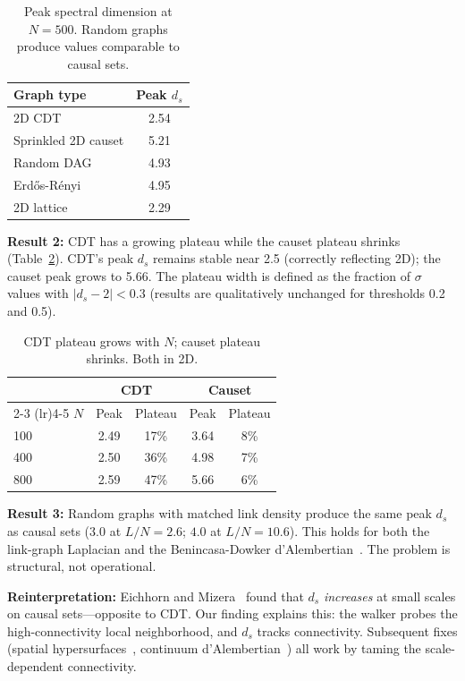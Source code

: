 \documentclass[aps,prd,twocolumn,superscriptaddress,nofootinbib]{revtex4-2}
\begin{document}
\begin{table}[h]
\centering
\begin{tabular}{lc}
\toprule
Graph type & Peak $d_s$ \\
\midrule
2D CDT & 2.54 \\
Sprinkled 2D causet & 5.21 \\
Random DAG & 4.93 \\
Erd\H{o}s-R\'enyi & 4.95 \\
2D lattice & 2.29 \\
\bottomrule
\end{tabular}
\caption{Peak spectral dimension at $N = 500$. Random graphs produce values comparable to causal sets.}
\label{tab:crossing}
\end{table}

\textbf{Result 2:} CDT has a growing plateau while the causet plateau shrinks (Table~\ref{tab:plateau}). CDT's peak $d_s$ remains stable near 2.5 (correctly reflecting 2D); the causet peak grows to 5.66. The plateau width is defined as the fraction of $\sigma$ values with $|d_s - 2| < 0.3$ (results are qualitatively unchanged for thresholds 0.2 and 0.5).

\begin{table}[h]
\centering
\begin{tabular}{lcccc}
\toprule
& \multicolumn{2}{c}{CDT} & \multicolumn{2}{c}{Causet} \\
\cmidrule(lr){2-3} \cmidrule(lr){4-5}
$N$ & Peak & Plateau & Peak & Plateau \\
\midrule
100 & 2.49 & 17\% & 3.64 & 8\% \\
400 & 2.50 & 36\% & 4.98 & 7\% \\
800 & 2.59 & 47\% & 5.66 & 6\% \\
\bottomrule
\end{tabular}
\caption{CDT plateau grows with $N$; causet plateau shrinks. Both in 2D.}
\label{tab:plateau}
\end{table}

\textbf{Result 3:} Random graphs with matched link density produce the same peak $d_s$ as causal sets ($3.0$ at $L/N = 2.6$; $4.0$ at $L/N = 10.6$). This holds for both the link-graph Laplacian and the Benincasa-Dowker d'Alembertian~\cite{benincasa2010}. The problem is structural, not operational.

\textbf{Reinterpretation:} Eichhorn and Mizera~\cite{eichhorn2014} found that $d_s$ \emph{increases} at small scales on causal sets---opposite to CDT. Our finding explains this: the walker probes the high-connectivity local neighborhood, and $d_s$ tracks connectivity. Subsequent fixes (spatial hypersurfaces~\cite{eichhorn2019}, continuum d'Alembertian~\cite{belenchia2016}) all work by taming the scale-dependent connectivity.
\end{document}
